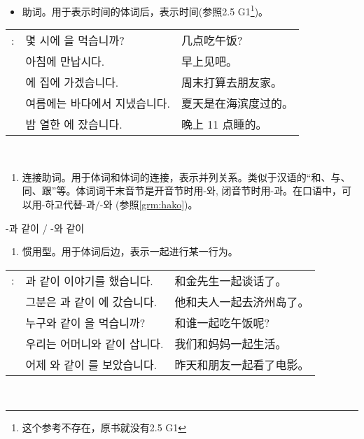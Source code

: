 \begin{grammar}
	\begin{grammarsect}[-에]
		\begin{itemize}
			\item 助词。用于表示时间的体词后，表示时间(参照2.5 G1\footnote{这个参考不存在，原书就没有2.5 G1})。\\
		\end{itemize}
		\begin{tabular}{lll}
			\ruby{例}{예}: & 몇 시에 \ruby{點心}{점심}을 먹습니까?              & 几点吃午饭?     \\
			             & 아침에 만납시다.                              & 早上见吧。      \\
			             & \ruby{週末}{주말}에 \ruby{親舊}{친구} 집에 가겠습니다. & 周末打算去朋友家。  \\
			             & 여름에는 바다에서 지냈습니다.                       & 夏天是在海滨度过的。 \\
			             & 밤 열한 \ruby{時}{시}에 잤습니다.                & 晚上 11 点睡的。
		\end{tabular}\\
	\end{grammarsect}
	\begin{grammarsect}[-과 / -와]\label{grm:ua}
		\begin{enumerate}
			\item 连接助词。用于体词和体词的连接，表示并列关系。类似于汉语的“和、与、同、跟”等。体词词干末音节是开音节时用-와, 闭音节时用-과。在口语中，可以用-하고代替-과/-와 (参照\ref{grm:hako})。
		\end{enumerate}
		{\large \HandRight -과 같이 / -와 같이\\}
		\begin{enumerate}
			\item 惯用型。用于体词后边，表示一起进行某一行为。\\
		\end{enumerate}
		\begin{tabular}{lll}
			\ruby{例}{예}: &\ruby{金}{김} \ruby{先生}{선생}과 같이 이야기를 했습니다. &和金先生一起谈话了。\\
			&그분은 \ruby{夫人}{부인}과 같이 \ruby{濟州島}{제주도}에 갔습니다. &他和夫人一起去济州岛了。 \\
			&누구와 같이 \ruby{點心}{점심}을 먹습니까?&和谁一起吃午饭呢? \\
			&우리는 어머니와 같이 삽니다.&我们和妈妈一起生活。\\
			&어제 \ruby{親舊}{친구}와 같이 \ruby{映畫}{영화}를 보았습니다.&昨天和朋友一起看了电影。\\
	\end{tabular}\\
	\end{grammarsect}
\end{grammar}
